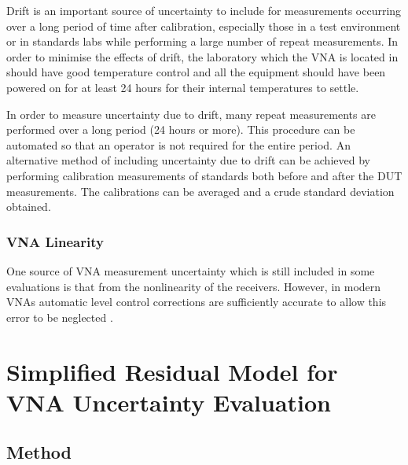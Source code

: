 \documentclass[../thesis/thesis.tex]{subfiles}
\begin{document}
Drift is an important source of uncertainty to include for measurements occurring over a long period of time after calibration, especially those in a test environment or in standards labs while performing a large number of repeat measurements. In order to minimise the effects of drift, the laboratory which the VNA is located in should have good temperature control and all the equipment should have been powered on for at least 24 hours for their internal temperatures to settle.

In order to measure uncertainty due to drift, many repeat measurements are performed over a long period (24 hours or more). This procedure can be automated so that an operator is not required for the entire period. An alternative method of including uncertainty due to drift can be achieved by performing calibration measurements of standards both before and after the DUT measurements. The calibrations can be averaged and a crude standard deviation obtained.

\subsubsection{VNA Linearity}

One source of VNA measurement uncertainty which is still included in some evaluations is that from the nonlinearity of the receivers. However, in modern VNAs automatic level control corrections are sufficiently accurate to allow this error to be neglected \cite{Rytting_2001, Martens_2007}.

\section{Simplified Residual Model for VNA Uncertainty Evaluation}
\subsection{Method}
\end{document}

